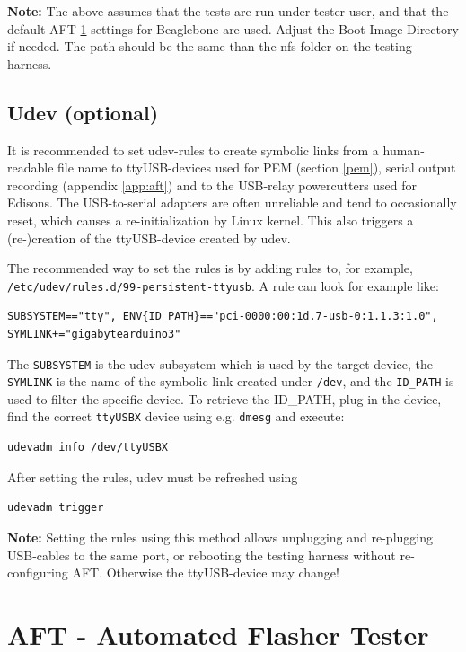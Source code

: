 \documentclass[a4paper,11pt]{article}
\newcommand{\note}{\textbf{Note: }}
\newcommand{\cmd}[1]{\texttt{#1}}
\begin{document}
\note The above assumes that the tests are run under tester-user, and that the default AFT \ref{aft} settings for Beaglebone are used. Adjust the Boot Image Directory if needed. The path should be the same than the nfs folder on the testing harness.

\subsection*{Udev (optional)}
It is recommended to set udev-rules to create symbolic links from a human-readable file name to ttyUSB-devices used for PEM (section \ref{pem}), serial output recording (appendix \ref{app:aft}) and to the USB-relay powercutters used for Edisons. The USB-to-serial adapters are often unreliable and tend to occasionally reset, which causes a re-initialization by Linux kernel. This also triggers a (re-)creation of the ttyUSB-device created by udev.

The recommended way to set the rules is by adding rules to, for example, \\ \cmd{/etc/udev/rules.d/99-persistent-ttyusb}. A rule can look for example like:
\begin{lstlisting}
SUBSYSTEM=="tty", ENV{ID_PATH}=="pci-0000:00:1d.7-usb-0:1.1.3:1.0", SYMLINK+="gigabytearduino3"
\end{lstlisting}
The \cmd{SUBSYSTEM} is the udev subsystem which is used by the target device, the \cmd{SYMLINK} is the name of the symbolic link created under \cmd{/dev}, and the \cmd{ID\_PATH} is used to filter the specific device. To retrieve the {ID\_PATH}, plug in the device, find the correct \cmd{ttyUSBX} device using e.g. \cmd{dmesg} and execute:
\begin{lstlisting}
udevadm info /dev/ttyUSBX
\end{lstlisting}

After setting the rules, udev must be refreshed using
\begin{lstlisting}
udevadm trigger
\end{lstlisting}

\note Setting the rules using this method allows unplugging and re-plugging USB-cables to the same port, or rebooting the testing harness without re-configuring AFT. Otherwise the ttyUSB-device may change!

\section{AFT - Automated Flasher Tester}
\label{aft}
\end{document}
